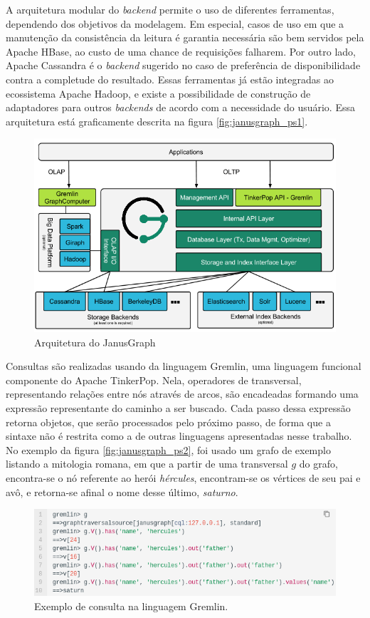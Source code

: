 \documentclass[conference]{IEEEtran}
\begin{document}
A arquitetura modular do \emph{backend} permite o uso de diferentes ferramentas, dependendo dos objetivos da modelagem. Em especial, casos de uso em que a manutenção da consistência da leitura é garantia necessária são bem servidos pela Apache HBase, ao custo de uma chance de requisições falharem. Por outro lado, Apache Cassandra é o \emph{backend} sugerido no caso de preferência de disponibilidade contra a completude do resultado. Essas ferramentas já estão integradas ao ecossistema Apache Hadoop, e existe a possibilidade de construção de adaptadores para outros \emph{backends} de acordo com a necessidade do usuário. Essa arquitetura está graficamente descrita na figura \ref{fig:janusgraph_ps1}.

\begin{figure}[htbp]
\centerline{\includegraphics[width=0.9\linewidth]{img/janusgraph/janusgraph_ps1.png}}
\caption{Arquitetura do JanusGraph}\label{fig:janusgraph_ps1}
\label{fig}
\end{figure}


Consultas são realizadas usando da linguagem Gremlin, uma linguagem funcional componente do Apache TinkerPop. Nela, operadores de transversal, representando relações entre nós através de arcos, são encadeadas formando uma expressão representante do caminho a ser buscado. Cada passo dessa expressão retorna objetos, que serão processados pelo próximo passo, de forma que a sintaxe não é restrita como a de outras linguagens apresentadas nesse trabalho. No exemplo da figura \ref{fig:janusgraph_ps2}, foi usado um grafo de exemplo listando a mitologia romana, em que a partir de uma transversal $g$ do grafo, encontra-se o nó referente ao herói \emph{hércules}, encontram-se os vértices de seu pai e avô, e retorna-se afinal o nome desse último, \emph{saturno}.

\begin{figure}[htbp]
\centerline{\includegraphics[width=0.9\linewidth]{img/janusgraph/janusgraph_ps2.png}}
\caption{Exemplo de consulta na linguagem Gremlin.}\label{fig:janusgraph_ps2}
\label{fig}
\end{figure}
\end{document}
